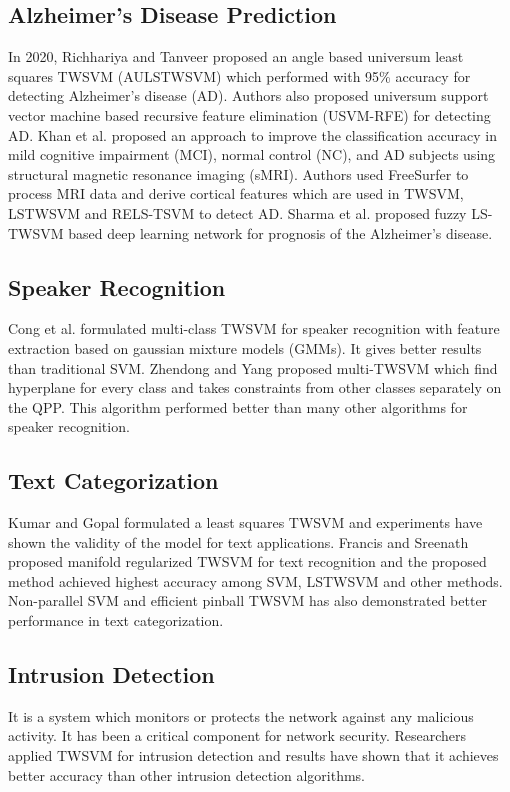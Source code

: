 \documentclass[pdflatex,sn-mathphys]{sn-jnl}%
\theoremstyle{thmstyleone}%
\theoremstyle{thmstyletwo}%
\theoremstyle{thmstylethree}%
\begin{document}
\subsection{Alzheimer's Disease Prediction}
In 2020, Richhariya and Tanveer \cite{richhariyaefficient} proposed an angle based universum least squares TWSVM (AULSTWSVM) which performed with 95\% accuracy for detecting Alzheimer's disease (AD). Authors \cite{richhariya2020diagnosis} also proposed universum support vector machine based recursive feature elimination (USVM-RFE) for detecting AD. Khan et al. \cite{khannovel} proposed an approach to improve the classification accuracy in mild cognitive impairment (MCI), normal control (NC), and AD subjects using structural magnetic resonance imaging (sMRI). Authors used FreeSurfer to process MRI data and derive cortical features which are used in TWSVM, LSTWSVM and RELS-TSVM to detect AD. Sharma et al. \cite{sharma2022fdn} proposed fuzzy LS-TWSVM based deep learning network for prognosis of the Alzheimer’s disease.





\subsection{Speaker Recognition}
Cong et al. \cite{cong2008efficient} formulated multi-class TWSVM for speaker recognition with feature extraction based on gaussian mixture models (GMMs). It gives better results than traditional SVM. Zhendong and Yang \cite{yang2009study} proposed multi-TWSVM which find hyperplane for every class and takes constraints from other classes separately on the QPP. This algorithm performed better than many other algorithms for speaker recognition.

\subsection{Text Categorization}
Kumar and Gopal \cite{kumar2009least} formulated a least squares TWSVM and experiments have shown the validity of the model for text applications. Francis and Sreenath \cite{francis2019robust} proposed manifold regularized TWSVM for text recognition and the proposed method achieved highest accuracy among SVM, LSTWSVM and other methods. Non-parallel SVM \cite{tian2014nonparallel} and efficient pinball TWSVM \cite{rastogi2021efficient} has also demonstrated better performance in text categorization.

\subsection{Intrusion Detection}
It is a system which monitors or protects the network against any malicious activity. It has been a critical component for network security. Researchers \cite{he2014intrusion,ding2008high,mousavi2015semi,nie2013application} applied TWSVM for intrusion detection and results have shown that it achieves better accuracy than other intrusion detection algorithms. 
\end{document}
